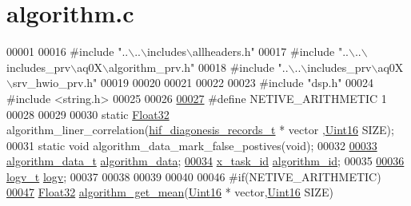 \hypertarget{a00038_source}{\section{algorithm.\+c}
\label{a00038_source}
}

\begin{DoxyCode}
00001 
00016 \textcolor{preprocessor}{#include "..\(\backslash\)..\(\backslash\)includes\(\backslash\)allheaders.h"} 
00017 \textcolor{preprocessor}{#include "..\(\backslash\)..\(\backslash\)includes\_prv\(\backslash\)aq0X\(\backslash\)algorithm\_prv.h"}
00018 \textcolor{preprocessor}{#include "..\(\backslash\)..\(\backslash\)includes\_prv\(\backslash\)aq0X\(\backslash\)srv\_hwio\_prv.h"}
00019 
00020 
00021 
00022 
00023 \textcolor{preprocessor}{#include "dsp.h"}
00024 \textcolor{preprocessor}{#include <string.h>}
00025 
00026 
\hypertarget{a00038_source_l00027}{}\hyperlink{a00038_ac8ba8f308052e254ac745ae76f44d766}{00027} \textcolor{preprocessor}{#define NETIVE\_ARITHMETIC                  1}
00028 
00029 
00030 \textcolor{keyword}{static} \hyperlink{a00072_a87d38f886e617ced2698fc55afa07637}{Float32} algorithm\_liner\_correlation(\hyperlink{a00022_a4726b814166e222a6f13e21453f76d8d}{hif\_diagonesis\_records\_t} * vector
      ,\hyperlink{a00072_a59a9f6be4562c327cbfb4f7e8e18f08b}{Uint16} SIZE);
00031 \textcolor{keyword}{static} \textcolor{keywordtype}{void}    algorithm\_data\_mark\_false\_postives(\textcolor{keywordtype}{void});
00032 
\hypertarget{a00038_source_l00033}{}\hyperlink{a00038_a183caa40cd01e79ee309cc9c4a225197}{00033} \hyperlink{a00016_d1/d84/a00097}{algorithm\_data\_t} \hyperlink{a00038_a183caa40cd01e79ee309cc9c4a225197}{algorithm\_data};
\hypertarget{a00038_source_l00034}{}\hyperlink{a00038_aff3e3d622fcd96787628167d3c1856f9}{00034} \hyperlink{a00036_ad5c3c5fbfd3e4aadf22830395484a71d}{x\_task\_id}        \hyperlink{a00038_aff3e3d622fcd96787628167d3c1856f9}{algorithm\_id};
00035 
\hypertarget{a00038_source_l00036}{}\hyperlink{a00038_a2e89c46668b39a17753c238950c9e1ec}{00036} \hyperlink{a00021_d6/da3/a00589}{logv\_t}           \hyperlink{a00038_a2e89c46668b39a17753c238950c9e1ec}{logv};
00037 
00038 
00039 
00040 
00046 \textcolor{preprocessor}{#if(NETIVE\_ARITHMETIC)}
\hypertarget{a00038_source_l00047}{}\hyperlink{a00038_ac02222eba93356b04a6327ffcf82b5cf}{00047} \hyperlink{a00072_a87d38f886e617ced2698fc55afa07637}{Float32} \hyperlink{a00038_ac02222eba93356b04a6327ffcf82b5cf}{algorithm\_get\_mean}(\hyperlink{a00072_a59a9f6be4562c327cbfb4f7e8e18f08b}{Uint16} * vector,\hyperlink{a00072_a59a9f6be4562c327cbfb4f7e8e18f08b}{Uint16} SIZE)

\end{DoxyCode}
